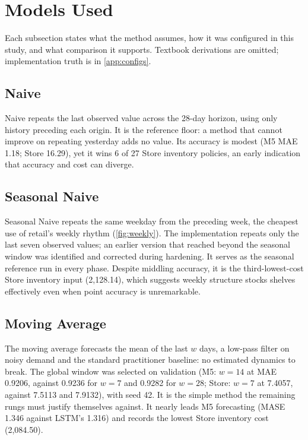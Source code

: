 \section{Models Used}
\label{sec:models}
Each subsection states what the method assumes, how it was configured in this
study, and what comparison it supports. Textbook derivations are omitted;
implementation truth is in \cref{app:configs}.

\subsection{Naive}
\label{sec:m-naive}
Naive repeats the last observed value across the 28-day horizon, using only
history preceding each origin. It is the reference floor: a method that cannot
improve on repeating yesterday adds no value. Its accuracy is modest (M5 MAE
1.18; Store 16.29), yet it wins 6 of 27 Store inventory policies, an early
indication that accuracy and cost can diverge.

\subsection{Seasonal Naive}
\label{sec:m-snaive}
Seasonal Naive repeats the same weekday from the preceding week, the cheapest
use of retail's weekly rhythm (\cref{fig:weekly}). The implementation repeats
only the last seven observed values; an earlier version that reached beyond
the seasonal window was identified and corrected during hardening. It serves
as the seasonal reference run in every phase. Despite middling accuracy, it is
the third-lowest-cost Store inventory input (2,128.14), which suggests weekly
structure stocks shelves effectively even when point accuracy is unremarkable.

\subsection{Moving Average}
\label{sec:m-ma}
The moving average forecasts the mean of the last $w$ days, a low-pass filter
on noisy demand and the standard practitioner baseline: no estimated dynamics
to break. The global window was selected on validation (M5: $w=14$ at MAE
0.9206, against 0.9236 for $w=7$ and 0.9282 for $w=28$; Store: $w=7$ at 7.4057,
against 7.5113 and 7.9132), with seed 42. It is the simple method the
remaining rungs must justify themselves against. It nearly leads M5
forecasting (MASE 1.346 against LSTM's 1.316) and records the lowest Store
inventory cost (2,084.50).

